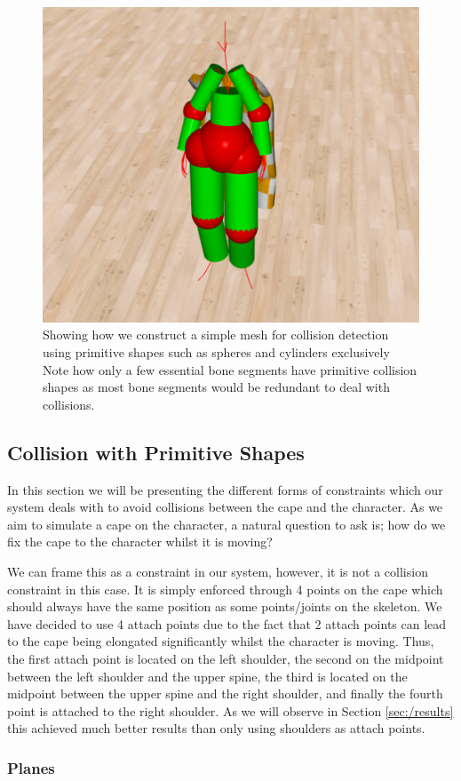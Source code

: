 \documentclass{article}
\begin{document}
\begin{figure}[!ht]
  \centering
  \includegraphics[width=.4\linewidth]{figs/skeleton.png}
  \caption{Showing how we construct a simple mesh for collision detection using primitive shapes such as spheres
  and cylinders exclusively Note how only a few essential bone segments have primitive collision shapes as most
  bone segments would be redundant to deal with collisions.}
  \label{fig:methodology/skeleton}
\end{figure}

\subsection{Collision with Primitive Shapes}

In this section we will be presenting the different forms of constraints which our system deals with to
avoid collisions between the cape and the character. As we aim to simulate a cape on the character, a natural
question to ask is; how do we fix the cape to the character whilst it is moving? 

We can frame this as a constraint in our system, however, it is not a collision constraint in this case.
It is simply enforced through 4 points on the cape which should always have the same position as some points/joints on
the skeleton. We have decided to use 4 attach points due to the fact that 2 attach points can lead to the
cape being elongated significantly whilst the character is moving. Thus, the first attach point is located on
the left shoulder, the second on the midpoint between the left shoulder and the upper spine, the third is located 
on the midpoint between the upper spine and the right shoulder, and finally the fourth point is attached to the
right shoulder. As we will observe in Section \ref{sec:/results} this achieved much better results than only using
shoulders as attach points.


\subsubsection{Planes}
\end{document}
